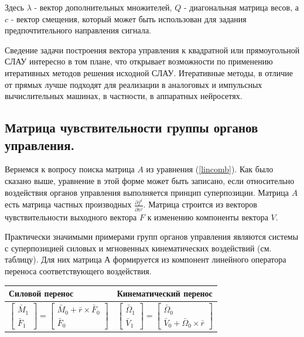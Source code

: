 \documentclass[a4paper]{article}
\begin{document}
Здесь $\lambda$ - вектор дополнительных множителей, $Q$ - диагональная матрица весов, а $c$ - вектор смещения, который может быть использован для задания предпочтительного направления сигнала. 

Сведение задачи построения вектора управления к квадратной или прямоугольной СЛАУ интересно в том плане, что открывает возможности по применению итеративных методов решения исходной СЛАУ. Итеративные методы, в отличие от прямых лучше подходят для реализации в аналоговых и импульсных вычислительных машинах, в частности, в аппаратных нейросетях.

\subsection{Матрица чувствительности группы органов управления.}
Вернемся к вопросу поиска матрица $A$ из уравнения (\ref{lincomb}). Как было сказано выше, уравнение в этой форме может быть записано, если относительно воздействия органов управления выполняется принцип суперпозиции. Матрица $A$ есть матрица частных производных $\frac{\partial{f^i}}{\partial{v^j}}$. Матрица строится из векторов чувствительности выходного вектора $F$ к изменению компоненты вектора $V$.

Практически значимыми примерами групп органов управления являются системы с суперпозицией силовых и мгновенных кинематических воздействий (см. таблицу). Для них матрица $А$ формируется из компонент линейного оператора переноса соответствующего воздействия.

\begin{table}[ht]
	\centering
	\begin{tabular}{| p{7cm} | p{7cm} |}
		\hline
		Силовой перенос & Кинематический перенос \\
		\hline
		\begin{equation} \label{eq:ftrans}
		\begin{bmatrix} \bar{M}_1 \\ \bar{F}_1 \end{bmatrix} 
			= \begin{bmatrix} \bar{M}_0 + \bar{r} \times \bar{F}_0 \\ \bar{F}_0 \end{bmatrix}
		\end{equation}
		&
		\begin{equation} \label{eq:ctrans}
		\begin{bmatrix} \bar{\Omega}_1 \\ \bar{V}_1 \end{bmatrix} 
			= \begin{bmatrix} \bar{\Omega}_0 \\ \bar{V}_0 + \bar{\Omega}_0 \times \bar{r} \end{bmatrix}
		\end{equation}\\
		
		\hline
	\end{tabular}
\end{table}
\end{document}
